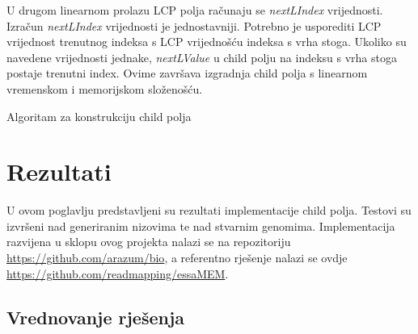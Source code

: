 \documentclass[times, utf8, seminar, numeric]{fer}
\begin{document}
U drugom linearnom prolazu LCP polja računaju se \textit{nextLIndex} vrijednosti. Izračun \textit{nextLIndex} vrijednosti je jednostavniji. Potrebno je usporediti LCP vrijednost trenutnog indeksa s LCP vrijednošću indeksa s vrha stoga. Ukoliko su navedene vrijednosti jednake, \textit{nextLValue} u child polju na indeksu s vrha stoga  postaje trenutni index. Ovime završava izgradnja child polja s linearnom vremenskom i memorijskom složenošću.

\begin{algorithm}[h]
	\caption{Algoritam za konstrukciju child polja}
	\label{alg:child-array}

	
\end{algorithm}

\chapter{Rezultati}

U ovom poglavlju predstavljeni su rezultati implementacije child polja. Testovi su izvršeni nad generiranim nizovima te nad stvarnim genomima. Implementacija razvijena u sklopu ovog projekta nalazi se na repozitoriju \url{https://github.com/arazum/bio}, a referentno rješenje nalazi se ovdje \url{https://github.com/readmapping/essaMEM}. 

\section{Vrednovanje rješenja}
\end{document}
